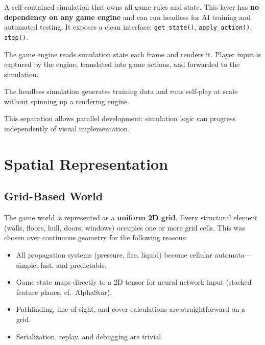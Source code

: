 \documentclass[11pt,a4paper]{article}
\begin{document}
\begin{description}[style=nextline]
    \item[Simulation Layer]
        A self-contained simulation that owns all game rules and state.
        This layer has \textbf{no dependency on any game engine} and can
        run headless for AI training and automated testing.  It exposes
        a clean interface: \texttt{get\_state()},
        \texttt{apply\_action()}, \texttt{step()}.

    \item[Presentation Layer]
        The game engine reads simulation state each frame and renders
        it.  Player input is captured by the engine, translated into
        game actions, and forwarded to the simulation.

    \item[Neural Network Training]
        The headless simulation generates training data and runs
        self-play at scale without spinning up a rendering engine.
\end{description}

This separation allows parallel development: simulation logic can
progress independently of visual implementation.

\section{Spatial Representation}
\label{sec:spatial}

\subsection{Grid-Based World}

The game world is represented as a \textbf{uniform 2D grid}.  Every
structural element (walls, floors, hull, doors, windows) occupies one or
more grid cells.  This was chosen over continuous geometry for the
following reasons:

\begin{itemize}
    \item All propagation systems (pressure, fire, liquid) become
          cellular automata---simple, fast, and predictable.
    \item Game state maps directly to a 2D tensor for neural network
          input (stacked feature planes, cf.\ AlphaStar).
    \item Pathfinding, line-of-sight, and cover calculations are
          straightforward on a grid.
    \item Serialization, replay, and debugging are trivial.
\end{itemize}
\end{document}
